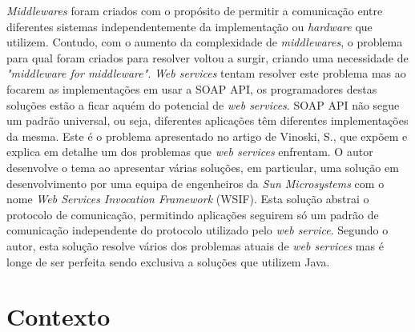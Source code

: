 \documentclass[sigplan]{acmart}
\begin{document}
\textit{Middlewares} foram criados com o propósito de permitir a comunicação entre diferentes sistemas independentemente da implementação ou \textit{hardware} que utilizem. Contudo, com o aumento da complexidade de \textit{middlewares}, o problema para qual foram criados para resolver voltou a surgir, criando uma necessidade de \textit{"middleware for middleware"}\cite{vinoskiMiddleware}. \textit{Web services} tentam resolver este problema mas ao focarem as implementações em usar a SOAP API, os programadores destas soluções estão a ficar aquém do potencial de \textit{web services}. SOAP API não segue um padrão universal, ou seja, diferentes aplicações têm diferentes implementações da mesma. Este é o problema apresentado no artigo de Vinoski, S.\cite{vinoskiIntegration}, que expõem e explica em detalhe um dos problemas que \textit{web services} enfrentam. O autor desenvolve o tema ao apresentar várias soluções, em particular, uma solução em desenvolvimento por uma equipa de engenheiros da \textit{Sun Microsystems} com o nome \textit{Web Services Invocation Framework} (WSIF). Esta solução abstrai o protocolo de comunicação, permitindo aplicações seguirem só um padrão de comunicação independente do protocolo utilizado pelo \textit{web service}. Segundo o autor, esta solução resolve vários dos problemas atuais de \textit{web services} mas é longe de ser perfeita sendo exclusiva a soluções que utilizem Java.

\section{Contexto} \label{sec:data}
\end{document}
